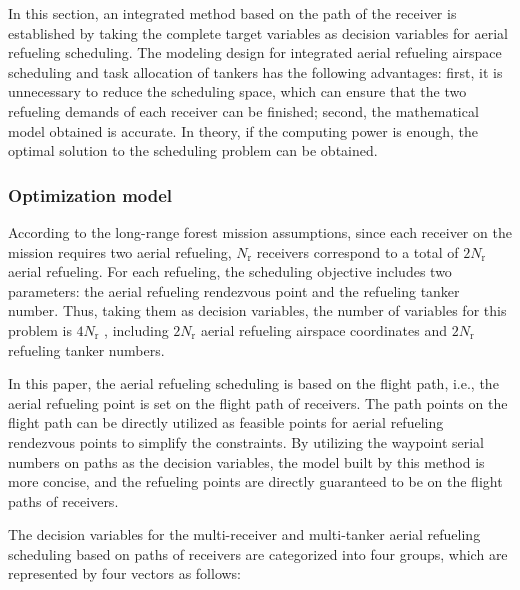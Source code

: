 In this section, an integrated method based on the path of the receiver is established by taking the complete target variables as decision variables for aerial refueling scheduling. The modeling design for integrated aerial refueling airspace scheduling and task allocation of tankers has the following advantages: first, it is unnecessary to reduce the scheduling space, which can ensure that the two refueling demands of each receiver can be finished; second, the mathematical model obtained is accurate. In theory, if the computing power is enough, the optimal solution to the scheduling problem can be obtained.





\subsubsection{Optimization model}

According to the long-range forest  mission assumptions, since each receiver on the mission requires two aerial refueling,  $N_\text{r}$ receivers correspond to a total of $2N_\text{r}$  aerial refueling. For each refueling, the scheduling objective includes two parameters: the aerial refueling rendezvous point and the refueling tanker number. Thus, taking them as decision variables, the number of variables for this problem is $4N_\text{r}$ , including $2N_\text{r}$  aerial refueling airspace coordinates and $2N_\text{r}$  refueling tanker numbers.

In this paper, the aerial refueling scheduling is based on the flight path, i.e., the aerial refueling point is set on the flight path of receivers. The path points on the flight path can be directly utilized as feasible points for aerial refueling rendezvous points to simplify the constraints. By utilizing the waypoint serial numbers on paths as the decision variables, the model built by this method is more concise, and the refueling points are directly guaranteed to be on the flight paths of receivers.

The decision variables for the multi-receiver and multi-tanker aerial refueling scheduling based on paths of receivers are categorized into four groups, which are represented by four vectors as follows:

